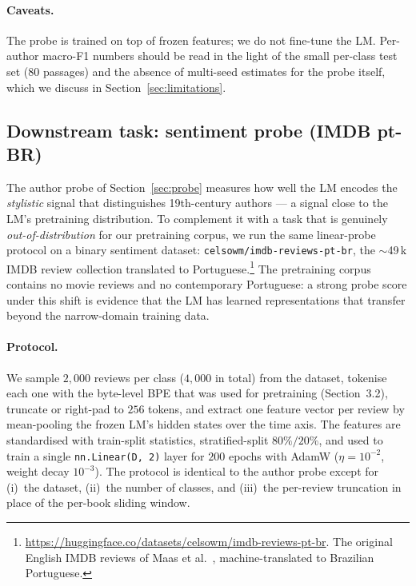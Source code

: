 \documentclass[11pt]{article}
\begin{document}
\paragraph{Caveats.}
The probe is trained on top of frozen features; we do not fine-tune the
LM. Per-author macro-F1 numbers should be read in the light of the
small per-class test set ($80$ passages) and the absence of multi-seed
estimates for the probe itself, which we discuss in
Section~\ref{sec:limitations}.

\subsection{Downstream task: sentiment probe (IMDB pt-BR)}\label{sec:sentiment}

The author probe of Section~\ref{sec:probe} measures how well the LM
encodes the \emph{stylistic} signal that distinguishes 19th-century
authors --- a signal close to the LM's pretraining distribution.
To complement it with a task that is genuinely \emph{out-of-distribution}
for our pretraining corpus, we run the same linear-probe protocol on a
binary sentiment dataset: \texttt{celsowm/imdb-reviews-pt-br}, the
$\sim$49\,k IMDB review collection translated to Portuguese.\footnote{%
\url{https://huggingface.co/datasets/celsowm/imdb-reviews-pt-br}.
The original English IMDB reviews of Maas et
al.~\cite{maas2011imdb}, machine-translated to Brazilian Portuguese.}
The pretraining corpus contains no movie reviews and no contemporary
Portuguese: a strong probe score under this shift is evidence that the
LM has learned representations that transfer beyond the
narrow-domain training data.

\paragraph{Protocol.}
We sample $2{,}000$ reviews per class ($4{,}000$ in total) from the
dataset, tokenise each one with the byte-level BPE that was used for
pretraining (Section~3.2), truncate or right-pad to $256$ tokens, and
extract one feature vector per review by mean-pooling the frozen LM's
hidden states over the time axis. The features are standardised with
train-split statistics, stratified-split $80\%/20\%$, and used to train
a single \texttt{nn.Linear(D, 2)} layer for $200$ epochs with AdamW
($\eta = 10^{-2}$, weight decay $10^{-3}$). The protocol is identical
to the author probe except for (i)~the dataset, (ii)~the number of
classes, and (iii)~the per-review truncation in place of the per-book
sliding window.
\end{document}
